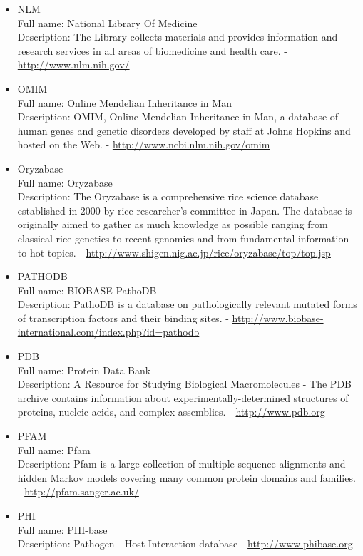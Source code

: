 \begin{itemize}
\item{NLM}\\ Full name: National Library Of Medicine\\ Description: The Library collects materials and provides information and research services in all areas of biomedicine and health care. - 
\url{http://www.nlm.nih.gov/}

\item{OMIM}\\ Full name: Online Mendelian Inheritance in Man\\ Description: OMIM, Online Mendelian Inheritance in Man, a database of human genes and genetic disorders developed by staff at Johns Hopkins and hosted on the Web. - 
\url{http://www.ncbi.nlm.nih.gov/omim}

\item{Oryzabase}\\ Full name: Oryzabase\\ Description: The Oryzabase is a comprehensive rice science database established in 2000 by rice researcher's committee in Japan. The database is originally aimed to gather as much knowledge as possible ranging from classical rice genetics to recent genomics and from fundamental information to hot topics. - 
\url{http://www.shigen.nig.ac.jp/rice/oryzabase/top/top.jsp}

\item{PATHODB}\\ Full name: BIOBASE PathoDB\\ Description: PathoDB is a database on pathologically relevant mutated forms of transcription factors and their binding sites. - 
\url{http://www.biobase-international.com/index.php?id=pathodb}

\item{PDB}\\ Full name: Protein Data Bank\\ Description: A Resource for Studying Biological Macromolecules - The PDB archive contains information about experimentally-determined structures of proteins, nucleic acids, and complex assemblies. - 
\url{http://www.pdb.org}

\item{PFAM}\\ Full name: Pfam\\ Description: Pfam is a large collection of multiple sequence alignments and hidden Markov models covering many common protein domains and families. - 
\url{http://pfam.sanger.ac.uk/}

\item{PHI}\\ Full name: PHI-base\\ Description: Pathogen - Host Interaction database - 
\url{http://www.phibase.org}


\end{itemize}
